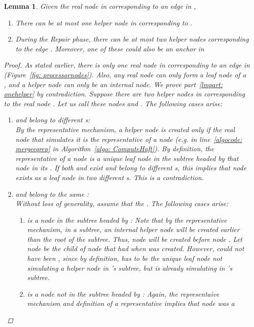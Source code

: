 \documentclass[11pt, letter]{article}
\newtheorem{lemma}{Lemma}
\begin{document}
\begin{lemma}
\label{lemma: hnodecounts}
Given the real node  in  corresponding to an edge  in ,
\begin{enumerate}
\item \label{lmpart: onehelper} There can be at most one helper node in  corresponding to .
\item  \label{lmpart: twohelper} During the Repair phase, there can be at most two helper nodes corresponding to the edge . Moreover, one of these could also be an anchor in 
\end{enumerate}
\begin{proof}
 As stated earlier, there is only one real node in  corresponding to an edge in  (Figure~\ref{fig:
processornodes}). Also, any real node can only form a leaf node of a , and a helper node can only be an
internal node. We prove  part~\ref{lmpart: onehelper} by contradiction. Suppose there are two helper nodes in  corresponding to
the real node . Let us call these nodes  and . The following cases arise:
\begin{enumerate}
\item \emph{ and  belong to different s:}\\
 By the representative mechanism, a helper node is created only if the real node that simulates it is the representative
of a node (e.g. in line~\ref{algocode: mergeeqrep} in Algorithm~\ref{algo: ComputeHaft}). By definition, the
representative of a node is a unique leaf node in the subtree headed by that node in its . If both  and 
exist and  belong to different s, this implies that node  exists as a leaf node in two different s. This is
a contradiction.
\item \emph{ and  belong to the same :}\\
 Without loss of generality, assume that the  . The following cases arise:
 \begin{enumerate}
  \item \emph{ is a node in the subtree headed by :}
     Note that by the representative mechanism, in a subtree, an internal helper node will be created earlier than the
root of the subtree. Thus, node  will be created before node .
Let node  be the child of node  that had  when  was created. However, 
    could not have been , since by definition,  has to be the unique leaf 
node not  simulating a helper node in 's subtree, but  is already simulating  in 's subtree.
  \item \emph{ is a node not in the subtree headed by :}
   Again, the representaive mechanism and definition of a representative implies that node  was a

\end{enumerate}
\end{enumerate}
\end{proof}
\end{lemma}
\end{document}
